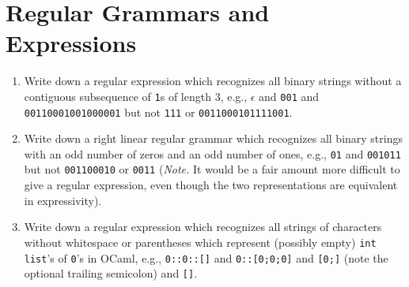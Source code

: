 \documentclass{article}
\theoremstyle{remark} \newtheorem*{solution}{Solution}
\begin{document}
\section{Regular Grammars and Expressions}
\begin{enumerate}
\item Write down a regular expression which recognizes all binary strings without a contiguous subsequence of \texttt{1}s of length $3$, e.g., $\epsilon$ and \texttt{001} and \texttt{00110001001000001} but not \texttt{111} or \texttt{0011000101111001}.
\item Write down a right linear regular grammar which recognizes all binary strings with an odd number of zeros and an odd number of ones, e.g., \texttt{01} and \texttt{001011} but not \texttt{001100010} or \texttt{0011} (\textit{Note.} It would be a fair amount more difficult to give a regular expression, even though the two representations are equivalent in expressivity).
\item Write down a regular expression which recognizes all strings of characters without whitespace or parentheses which represent (possibly empty) \texttt{int list}'s of \texttt{0}'s in OCaml, e.g., \texttt{0::0::[]} and \texttt{{0::[0;0;0]}} and \texttt{[0;]} (note the optional trailing semicolon) and \texttt{[]}.
\end{enumerate}
\end{document}
